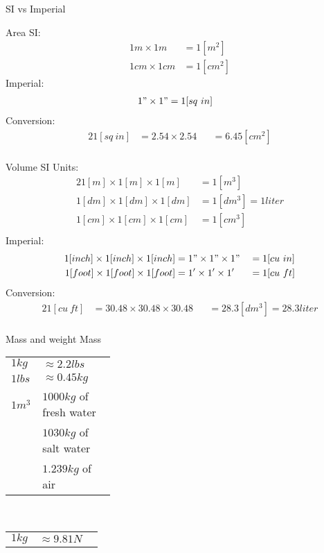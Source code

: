 \documentclass[aspectratio=1610,english,12pt]{beamer}
\begin{document}
\begin{frame}{SI vs Imperial}  
\end{frame}

\begin{frame}{Area}
	SI:
	\begin{align*}
		1m \times 1m &= 1[m^2]\\
		1cm \times 1cm &= 1[cm^2]
	\end{align*}
	Imperial:
	\begin{align*}
		1" \times 1" &= 1[sq\ in]
	\end{align*}
	Conversion:
	\begin{alignat*}{2}
				1[sq\ in] &= 2.54 \times 2.54	&	&= 6.45[cm^2]\\
	\end{alignat*}
\end{frame}

\begin{frame}{Volume}
	SI Units:
	\begin{alignat*}{2}
				1[m] \times 1[m] \times 1[m] &= 1[m^3] \\
				1[dm] \times 1[dm] \times 1[dm] &= 1[dm^3] = 1 liter\\
				1[cm] \times 1[cm] \times 1[cm] &= 1[cm^3]\\
	\end{alignat*}
	Imperial:
	\begin{alignat*}{3}
				1[inch] \times 1[inch] \times 1[inch] &= 1" \times 1"	 \times 1"	&	&= 1[cu\ in]\\
				1[foot] \times 1[foot] \times 1[foot] &= 1' \times 1'	 \times 1'	&	&= 1[cu\ ft]\\
	\end{alignat*}
	Conversion:
	\begin{alignat*}{2}
				1[cu\ ft] &= 30.48 \times 30.48 \times 30.48 &	&= 28.3 [dm^3] = 28.3 liter\\
	\end{alignat*}
\end{frame}

\begin{frame}{Mass and weight}
	Mass\\
	\begin{tabular}{p{0.3\linewidth} l}
		$1 kg$ & $\approx 2.2 lbs$ \\
		$1 lbs$ & $\approx 0.45 kg$ \\
		$1 m^3$ & $1000 kg$ of fresh water\\
		& $1030 kg$ of salt water\\
		& $ 1.239 kg$ of air
	\end{tabular}
	\\
	\begin{tabular}{p{0.3\linewidth} l}
		$1kg$ & $\approx9.81N$
	\end{tabular}
\end{frame}
\end{document}
